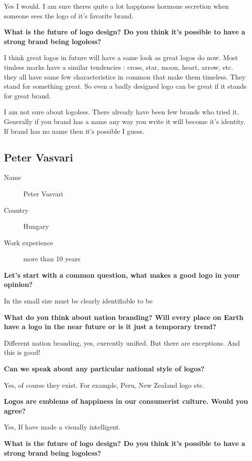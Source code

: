 Yes I would. I am sure theres quite a lot happiness hormone secretion when
someone sees the logo of it’s favorite brand.


\textbf{What is the future of logo design? Do you think it's possible to have a
  strong brand being logoless?}

I think great logos in future will have a same look as great logos do now. Most
timless marks have a similar tendencies : cross, star, moon, heart, arrow,
etc. they all have same few characteristics in common that make them
timeless. They stand for something great. So even a badly designed logo can be
great if it stands for great brand.

I am not sure about logoless. There already have been few brands who tried
it. Generally if you brand has a name any way you write it will become it's
identity. If brand has no name then it's possible I guess.


\clearpage
\subsection{Peter Vasvari}

\begin{description}
\item[Name] Peter Vasvari
\item[Country] Hungary
\item[Work experience] more than 10 years
\end{description}

\textbf{Let's start with a common question, what makes a good logo in your
  opinion? }

In the small size must be clearly identifiable to be


\textbf{What do you think about nation branding? Will every place on Earth have
  a logo in the near future or is it just a temporary trend?}

Different nation branding, yes, currently unified. But there are exceptions. And
this is good!


\textbf{Can we speak about any particular national style of logos?}

Yes, of course they exist. For example, Peru, New Zealand logo etc.


\textbf{Logos are emblems of happiness in our consumerist culture. Would you
  agree?}

Yes, If have made a visually intelligent.


\textbf{What is the future of logo design? Do you think it's possible to have a
  strong brand being logoless?}

